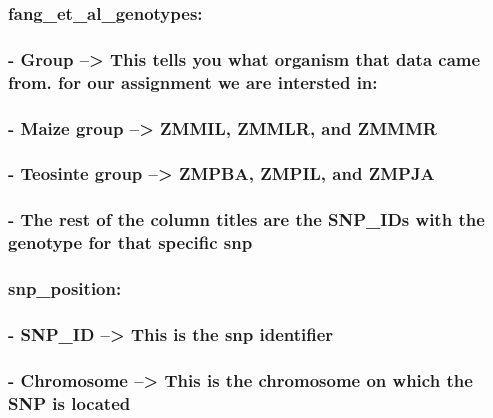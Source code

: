 \documentclass[
]{article}
\begin{document}
\subsubsection{fang\_et\_al\_genotypes:}\label{fang_et_al_genotypes}

\subsubsection{- Group --\textgreater{} This tells you what organism
that data came from. for our assignment we are intersted
in:}\label{group-this-tells-you-what-organism-that-data-came-from.-for-our-assignment-we-are-intersted-in}

\subsubsection{- Maize group --\textgreater{} ZMMIL, ZMMLR, and
ZMMMR}\label{maize-group-zmmil-zmmlr-and-zmmmr}

\subsubsection{- Teosinte group --\textgreater{} ZMPBA, ZMPIL, and
ZMPJA}\label{teosinte-group-zmpba-zmpil-and-zmpja}

\subsubsection{- The rest of the column titles are the SNP\_IDs with the
genotype for that specific
snp}\label{the-rest-of-the-column-titles-are-the-snp_ids-with-the-genotype-for-that-specific-snp}

\subsubsection{snp\_position:}\label{snp_position}

\subsubsection{- SNP\_ID --\textgreater{} This is the snp
identifier}\label{snp_id-this-is-the-snp-identifier}

\subsubsection{- Chromosome --\textgreater{} This is the chromosome on
which the SNP is
located}\label{chromosome-this-is-the-chromosome-on-which-the-snp-is-located}
\end{document}
